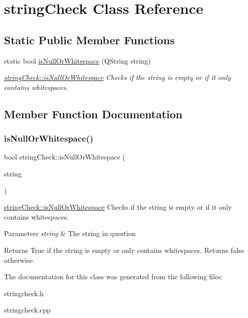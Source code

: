 \hypertarget{classstring_check}{}\section{string\+Check Class Reference}
\label{classstring_check}
\subsection*{Static Public Member Functions}
\begin{DoxyCompactItemize}
\item 
static bool \mbox{\hyperlink{classstring_check_a25a6eebd6a36799e3a2c8335288929d2}{is\+Null\+Or\+Whitespace}} (Q\+String string)
\begin{DoxyCompactList}\small\item\em \mbox{\hyperlink{classstring_check_a25a6eebd6a36799e3a2c8335288929d2}{string\+Check\+::is\+Null\+Or\+Whitespace}} Checks if the string is empty or if it only contains whitespaces. \end{DoxyCompactList}\end{DoxyCompactItemize}


\subsection{Member Function Documentation}
\mbox{\label{classstring_check_a25a6eebd6a36799e3a2c8335288929d2}} 
\subsubsection{\texorpdfstring{isNullOrWhitespace()}{isNullOrWhitespace()}}
{\footnotesize\ttfamily bool string\+Check\+::is\+Null\+Or\+Whitespace (\begin{DoxyParamCaption}\item[{Q\+String}]{string }\end{DoxyParamCaption})\hspace{0.3cm}{\ttfamily [static]}}



\mbox{\hyperlink{classstring_check_a25a6eebd6a36799e3a2c8335288929d2}{string\+Check\+::is\+Null\+Or\+Whitespace}} Checks if the string is empty or if it only contains whitespaces. 


\begin{DoxyParams}{Parameters}
{\em string} & The string in question \\
\hline
\end{DoxyParams}
\begin{DoxyReturn}{Returns}
True if the string is empty or only contains whitespaces. Returns false otherwise. 
\end{DoxyReturn}


The documentation for this class was generated from the following files\+:\begin{DoxyCompactItemize}
\item 
stringcheck.\+h\item 
stringcheck.\+cpp\end{DoxyCompactItemize}
